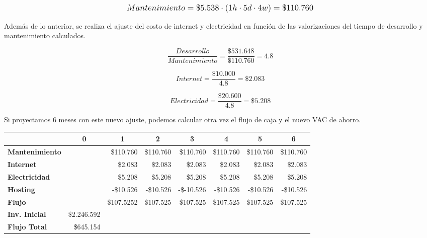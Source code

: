 \[
\mathlarger{
	Mantenimiento = \$5.538 \cdot \left(1h\cdot5d\cdot4w\right) = \$110.760
}
\]

Además de lo anterior, se realiza el ajuste del costo de internet y electricidad en función de las valorizaciones del tiempo de desarrollo y mantenimiento calculados.

\[
\frac{Desarrollo}{Mantenimiento} = \frac{\$531.648}{\$110.760} = 4.8
\]

\[
Internet = \frac{\$10.000}{4.8} = \$2.083
\]

\[
Electricidad = \frac{\$20.600}{4.8} = \$5.208
\]

Si proyectamos 6 meses con este nuevo ajuste, podemos calcular otra vez el flujo de caja y el nuevo VAC de ahorro.

\begin{center}
	\begin{tabular}{ | l | l | l | l | l | l | l | l |}
		\hline
		& \multicolumn{1}{|c|}{\textbf{0}} & \multicolumn{1}{|c|}{\textbf{1}} & \multicolumn{1}{|c|}{\textbf{2}} & \multicolumn{1}{|c|}{\textbf{3}} & \multicolumn{1}{|c|}{\textbf{4}} & \multicolumn{1}{|c|}{\textbf{5}} & \multicolumn{1}{|c|}{\textbf{6}} \\
		\hline
		{\textbf{Mantenimiento}} &  & \multicolumn{1}{|r|}{\$110.760} & \multicolumn{1}{|r|}{\$110.760} & \multicolumn{1}{|r|}{\$110.760} & \multicolumn{1}{|r|}{\$110.760} & \multicolumn{1}{|r|}{\$110.760} & \multicolumn{1}{|r|}{\$110.760} \\ \hline
		
		{\textbf{Internet}} &  & \multicolumn{1}{|r|}{\$2.083} & \multicolumn{1}{|r|}{\$2.083} & \multicolumn{1}{|r|}{\$2.083} & \multicolumn{1}{|r|}{\$2.083} & \multicolumn{1}{|r|}{\$2.083} & \multicolumn{1}{|r|}{\$2.083} \\ \hline
		
		{\textbf{Electricidad}} &  & \multicolumn{1}{|r|}{\$5.208} & \multicolumn{1}{|r|}{\$5.208} & \multicolumn{1}{|r|}{\$5.208} & \multicolumn{1}{|r|}{\$5.208} & \multicolumn{1}{|r|}{\$5.208} & \multicolumn{1}{|r|}{\$5.208} \\ \hline
		
		{\textbf{Hosting}} &  & \multicolumn{1}{|r|}{-\$10.526} & \multicolumn{1}{|r|}{-\$10.526} & \multicolumn{1}{|r|}{-\$-10.526} & \multicolumn{1}{|r|}{-\$10.526} & \multicolumn{1}{|r|}{-\$10.526} & \multicolumn{1}{|r|}{-\$10.526} \\ \hline
		
		{\textbf{Flujo}} &  & \multicolumn{1}{|r|}{\$107.5252} & \multicolumn{1}{|r|}{\$107.525} & \multicolumn{1}{|r|}{\$107.525} & \multicolumn{1}{|r|}{\$107.525} & \multicolumn{1}{|r|}{\$107.525} & \multicolumn{1}{|r|}{\$107.525} \\ \hline
		{\textbf{Inv. Inicial}} & \multicolumn{1}{|r|}{\$2.246.592} & & & & & & \\ \hline
		\textbf{Flujo Total} & \multicolumn{1}{|r|}{\$645.154} & & & & & & \\ \hline
	\end{tabular}
\end{center}

